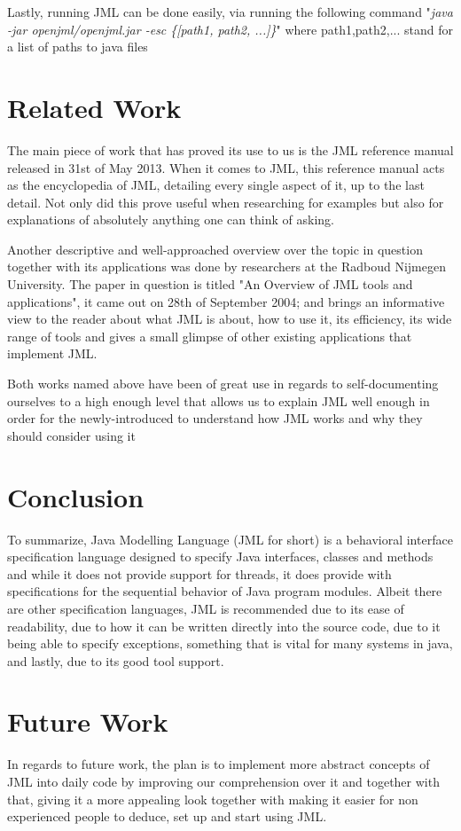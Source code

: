 \documentclass{article}
\begin{document}
Lastly, running JML can be done easily, via running the following command "\textit{java -jar openjml/openjml.jar -esc \{[path1, path2, ...]\}}" where path1,path2,... stand for a list of paths to java files


\section{Related Work}
The main piece of work that has proved its use to us is the JML reference manual released in 31st of May 2013. When it comes to JML, this reference manual acts as the encyclopedia of JML, detailing every single aspect of it, up to the last detail. Not only did this prove useful when researching for examples but also for explanations of absolutely anything one can think of asking.

Another descriptive and well-approached overview over the topic in question together with its applications was done by researchers at the Radboud Nijmegen University. The paper in question is titled "An Overview of JML tools and applications", it came out on 28th of September 2004; and brings an informative view to the reader about what JML is about, how to use it, its efficiency, its wide range of tools and gives a small glimpse of other existing applications that implement JML.

Both works named above have been of great use in regards to self-documenting ourselves to a high enough level that allows us to explain JML well enough in order for the newly-introduced to understand how JML works and why they should consider using it 




\section{Conclusion}
To summarize, Java Modelling Language (JML for short) is a behavioral interface specification language designed to specify Java interfaces, classes and methods and while it does not provide support for threads, it does provide with specifications for the sequential behavior of Java program modules. Albeit there are other specification languages, JML is recommended due to its ease of readability, due to how it can be written directly into the source code, due to it being able to specify exceptions, something that is vital for many systems in java, and lastly, due to its good tool support.





\section{Future Work}
In regards to future work, the plan is to implement more abstract concepts of JML into daily code by improving our comprehension over it and together with that, giving it a more appealing look together with making it easier for non experienced people to deduce, set up and start using JML.


\clearpage


%
%
\printbibliography
\end{document}
